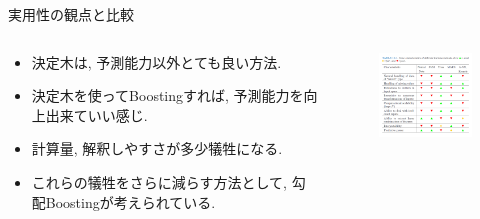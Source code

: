 \documentclass[dvipdfmx,8pt]{beamer}
\begin{document}
  \begin{frame}{実用性の観点と比較}
    \begin{columns}[t]
      \begin{column}{0.5\linewidth}
        \begin{itemize}
          \item 決定木は, 予測能力以外とても良い方法.
          \item 決定木を使ってBoostingすれば, 予測能力を向上出来ていい感じ.
          \item 計算量, 解釈しやすさが多少犠牲になる.
          \item これらの犠牲をさらに減らす方法として, 勾配Boostingが考えられている.
        \end{itemize}
      \end{column}
      \begin{column}{0.5\linewidth}
        \begin{figure}[htb]
          \centering
          \includegraphics[width=5cm,clip]{images/OffTheShelf.png}
        \end{figure}
      \end{column}
    \end{columns}
  \end{frame}
\end{document}
